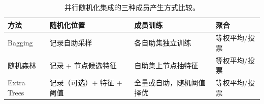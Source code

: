 \begin{table}[htbp]
  \centering
  \small
  \begin{tabularx}{\linewidth}{@{}>{\RaggedRight\arraybackslash}p{22mm}>{\RaggedRight\arraybackslash}X>{\RaggedRight\arraybackslash}X>{\RaggedRight\arraybackslash}X@{}}
    \toprule
    方法 & 随机化位置 & 成员训练 & 聚合\\
    \midrule
    Bagging & 记录自助采样 & 各自助集独立训练 & 等权平均/投票\\
    随机森林 & 记录 + 节点候选特征 & 自助集上节点抽特征 & 等权平均/投票\\
    Extra Trees & 记录（可选）+ 特征 + 阈值 & 全量或自助，随机阈值择优 & 等权平均/投票\\
    \bottomrule
  \end{tabularx}
  \caption{并行随机化集成的三种成员产生方式比较。}
  \label{tab:ensemble-bagging-comparison}
\end{table}
